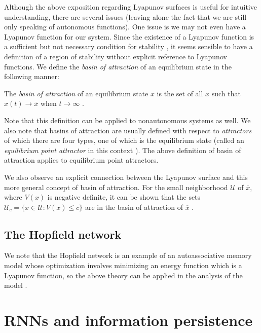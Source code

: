 Although the above exposition regarding Lyapunov surfaces is useful for intuitive understanding, there are several issues (leaving alone the fact that we are still only speaking of autonomous functions). One issue is we may not even have a Lyapunov function for our system. Since the existence of a Lyapunov function is a sufficient but not necessary condition for stability \cite[p. 683]{Haykin:2009:NNC:1213811}, it seems sensible to have a definition of a region of stability without explicit reference to Lyapunov functions. We define the \emph{basin of attraction} of an equilibrium state in the following manner:

\begin{definition}
The \emph{basin of attraction} of an equilibrium state $\overline{x}$ is the set of all $x$ such that $x(t) \to \overline{x}$ when $t \to \infty$ \cite{ocostin}.
\end{definition}

Note that this definition can be applied to nonautonomous systems as well. We also note that basins of attraction are usually defined with respect to \emph{attractors} of which there are four types, one of which is the equilibrium state (called an \emph{equilibrium point attractor} in this context \cite[p. 179]{DBLP:journals/ai/Beer95}). The above definition of basin of attraction applies to equilibrium point attractors.

We also observe an explicit connection between the Lyapunov surface and this more general concept of basin of attraction. For the small neighborhood $\mathcal{U}$ of $\overline{x}$, where $V(x)$ is negative definite, it can be shown that the sets $\mathcal{U}_c = \{x \in \mathcal{U} : V(x) \leq c\}$ are in the basin of attraction of $\overline{x}$ \cite{anovozhilov}.

\subsection{The Hopfield network}

We note that the Hopfield network is an example of an autoassociative memory model whose optimization involves minimizing an energy function which is a Lyapunov function, so the above theory can be applied in the analysis of the model \cite[p. 691]{Haykin:2009:NNC:1213811}.

\section{RNNs and information persistence}

